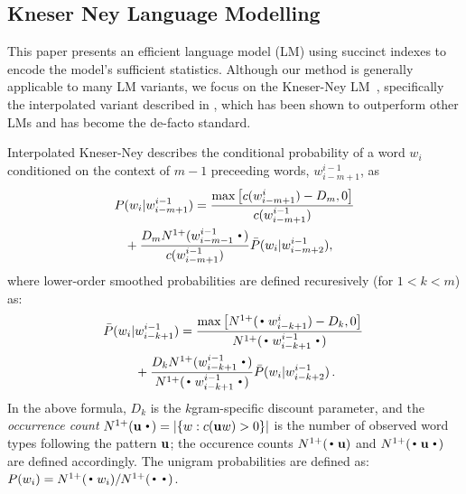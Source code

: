 
\subsection{Kneser Ney Language Modelling}
\label{sec-lm}


This paper presents an efficient \ngram language model (LM) using succinct indexes to encode the model's sufficient statistics. %
Although our method is generally applicable to many LM variants, 
we focus on the Kneser-Ney LM~\cite{kneser1995improved}, 
specifically the interpolated variant described in , 
which has been shown to outperform other \ngram LMs and has become the de-facto standard.

Interpolated Kneser-Ney describes the conditional probability of a word $w_i$ conditioned on the context of $m-1$ preceeding words, $w_{i-m+1}^{i-1}$, as 
\begin{align}
P(w_i |& w_{i-m+1}^{i-1})=\frac{\max\left[c(w^{i}_{i-m+1}) - D_m,0\right]}{c(w^{i-1}_{i-m+1})} \nonumber \\
& \hspace{-6mm} +\frac{D_m \nlplus{w^{i-1}_{i-m-1}\Bigcdot} }{c(w^{i-1}_{i-m+1})}  
\bar{P}(w_i | w_{i-m+2}^{i-1}) ,  
\label{eq:high}
\end{align}
where lower-order smoothed probabilities are defined recuresively (for $1<k<m$) as: 
\begin{align}
\! \bar{P}(w_i |& w_{i-k+1}^{i-1})
 = \frac{\max\left[\nlplus{\Bigcdot w_{i-k+1}^{i}} - D_k,0\right]}{\nlplus{\Bigcdot w_{i-k+1}^{i-1} \Bigcdot}} \nonumber \\
&+ \frac{D_k \nlplus{w_{i-k+1}^{i-1}\Bigcdot}}{\nlplus{\Bigcdot w_{i-k+1}^{i-1} \Bigcdot}} \bar{P}(w_i | w_{i-k+2}^{i-1}) \,  . \! \label{eq:mid}
\end{align}
In the above formula, $D_k$ is the $k$gram-specific discount parameter, and 
the \emph{occurrence count} 
\mbox{$\nlplus{\uu\Bigcdot} = |\{w: c(\uu w)>0\}|$} 
is the number of observed word types following the pattern ${\mathbf{u}}$; 
the occurence counts $\nlplus{\Bigcdot\uu}$ and $\nlplus{\Bigcdot\uu\Bigcdot}$ 
are defined accordingly.
The unigram probabilities are defined as:
%
$ P(w_i) = \nlplus{\Bigcdot w_i} / \nlplus{\Bigcdot\Bigcdot}$.

